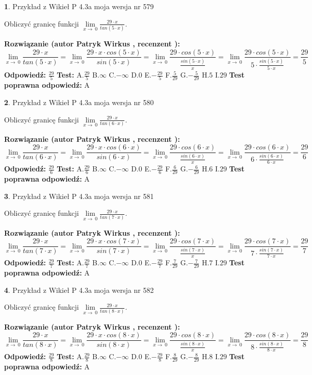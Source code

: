 \documentclass[12pt, a4paper]{article}
\theoremstyle{definition} %
\newtheorem{zad}{}
\newcommand{\zadStart}[1]{\begin{zad}#1\newline}
\newcommand{\zadStop}{\end{zad}}
\newcommand{\rozwStart}[2]{\noindent \textbf{Rozwiązanie (autor #1 , recenzent #2): }\newline}
\newcommand{\rozwStop}{\newline}
\newcommand{\odpStart}{\noindent \textbf{Odpowiedź:}\newline}
\newcommand{\odpStop}{\newline}
\newcommand{\testStart}{\noindent \textbf{Test:}\newline}
\newcommand{\testStop}{\newline}
\newcommand{\kluczStart}{\noindent \textbf{Test poprawna odpowiedź:}\newline}
\newcommand{\kluczStop}{\newline}
\begin{document}
\zadStart{Przykład z Wikieł P 4.3a moja wersja nr 579}


Obliczyć granicę funkcji $\lim\limits_{x\to\ 0}\frac{29 \cdot x}{tan(5 \cdot x)}$.
\zadStop
\rozwStart{Patryk Wirkus}{}
$$\lim\limits_{x\to\ 0}\frac{29 \cdot x}{tan(5 \cdot x)}=\lim\limits_{x\to\ 0}\frac{29 \cdot x \cdot cos(5 \cdot x)}{sin(5 \cdot x)}=\lim\limits_{x\to\ 0}\frac{29 \cdot cos(5 \cdot x)}{\frac{sin(5 \cdot x)}{x}}=\lim\limits_{x\to\ 0}\frac{29 \cdot cos(5 \cdot x)}{5 \cdot \frac{sin(5 \cdot x)}{5 \cdot x}} = \frac{29}{5}$$
\rozwStop
\odpStart
$\frac{29}{5}$
\odpStop
\testStart
A.$\frac{29}{5}$
B.$\infty$
C.$-\infty$
D.$0$
E.$-\frac{29}{5}$
F.$\frac{5}{29}$
G.$-\frac{5}{29}$
H.$5$
I.$29$
\testStop
\kluczStart
A
\kluczStop



\zadStart{Przykład z Wikieł P 4.3a moja wersja nr 580}


Obliczyć granicę funkcji $\lim\limits_{x\to\ 0}\frac{29 \cdot x}{tan(6 \cdot x)}$.
\zadStop
\rozwStart{Patryk Wirkus}{}
$$\lim\limits_{x\to\ 0}\frac{29 \cdot x}{tan(6 \cdot x)}=\lim\limits_{x\to\ 0}\frac{29 \cdot x \cdot cos(6 \cdot x)}{sin(6 \cdot x)}=\lim\limits_{x\to\ 0}\frac{29 \cdot cos(6 \cdot x)}{\frac{sin(6 \cdot x)}{x}}=\lim\limits_{x\to\ 0}\frac{29 \cdot cos(6 \cdot x)}{6 \cdot \frac{sin(6 \cdot x)}{6 \cdot x}} = \frac{29}{6}$$
\rozwStop
\odpStart
$\frac{29}{6}$
\odpStop
\testStart
A.$\frac{29}{6}$
B.$\infty$
C.$-\infty$
D.$0$
E.$-\frac{29}{6}$
F.$\frac{6}{29}$
G.$-\frac{6}{29}$
H.$6$
I.$29$
\testStop
\kluczStart
A
\kluczStop



\zadStart{Przykład z Wikieł P 4.3a moja wersja nr 581}


Obliczyć granicę funkcji $\lim\limits_{x\to\ 0}\frac{29 \cdot x}{tan(7 \cdot x)}$.
\zadStop
\rozwStart{Patryk Wirkus}{}
$$\lim\limits_{x\to\ 0}\frac{29 \cdot x}{tan(7 \cdot x)}=\lim\limits_{x\to\ 0}\frac{29 \cdot x \cdot cos(7 \cdot x)}{sin(7 \cdot x)}=\lim\limits_{x\to\ 0}\frac{29 \cdot cos(7 \cdot x)}{\frac{sin(7 \cdot x)}{x}}=\lim\limits_{x\to\ 0}\frac{29 \cdot cos(7 \cdot x)}{7 \cdot \frac{sin(7 \cdot x)}{7 \cdot x}} = \frac{29}{7}$$
\rozwStop
\odpStart
$\frac{29}{7}$
\odpStop
\testStart
A.$\frac{29}{7}$
B.$\infty$
C.$-\infty$
D.$0$
E.$-\frac{29}{7}$
F.$\frac{7}{29}$
G.$-\frac{7}{29}$
H.$7$
I.$29$
\testStop
\kluczStart
A
\kluczStop



\zadStart{Przykład z Wikieł P 4.3a moja wersja nr 582}


Obliczyć granicę funkcji $\lim\limits_{x\to\ 0}\frac{29 \cdot x}{tan(8 \cdot x)}$.
\zadStop
\rozwStart{Patryk Wirkus}{}
$$\lim\limits_{x\to\ 0}\frac{29 \cdot x}{tan(8 \cdot x)}=\lim\limits_{x\to\ 0}\frac{29 \cdot x \cdot cos(8 \cdot x)}{sin(8 \cdot x)}=\lim\limits_{x\to\ 0}\frac{29 \cdot cos(8 \cdot x)}{\frac{sin(8 \cdot x)}{x}}=\lim\limits_{x\to\ 0}\frac{29 \cdot cos(8 \cdot x)}{8 \cdot \frac{sin(8 \cdot x)}{8 \cdot x}} = \frac{29}{8}$$
\rozwStop
\odpStart
$\frac{29}{8}$
\odpStop
\testStart
A.$\frac{29}{8}$
B.$\infty$
C.$-\infty$
D.$0$
E.$-\frac{29}{8}$
F.$\frac{8}{29}$
G.$-\frac{8}{29}$
H.$8$
I.$29$
\testStop
\kluczStart
A
\kluczStop
\end{document}
